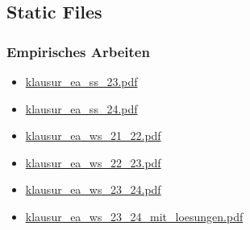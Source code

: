\documentclass[
  letterpaper,
  DIV=11]{scrartcl}
\providecommand{\tightlist}{%
  \setlength{\itemsep}{0pt}\setlength{\parskip}{0pt}}\usepackage{longtable,booktabs,array}
\begin{document}
\subsection{Static Files}\label{static-files}

\subsubsection{Empirisches Arbeiten}\label{empirisches-arbeiten}

\begin{itemize}
\tightlist
\item
  \href{static/empirisches_arbeiten/klausur_ea_ss_23.pdf}{klausur\_ea\_ss\_23.pdf}
\item
  \href{static/empirisches_arbeiten/klausur_ea_ss_24.pdf}{klausur\_ea\_ss\_24.pdf}
\item
  \href{static/empirisches_arbeiten/klausur_ea_ws_21_22.pdf}{klausur\_ea\_ws\_21\_22.pdf}
\item
  \href{static/empirisches_arbeiten/klausur_ea_ws_22_23.pdf}{klausur\_ea\_ws\_22\_23.pdf}
\item
  \href{static/empirisches_arbeiten/klausur_ea_ws_23_24.pdf}{klausur\_ea\_ws\_23\_24.pdf}
\item
  \href{static/empirisches_arbeiten/klausur_ea_ws_23_24_mit_loesungen.pdf}{klausur\_ea\_ws\_23\_24\_mit\_loesungen.pdf}
\end{itemize}
\end{document}
